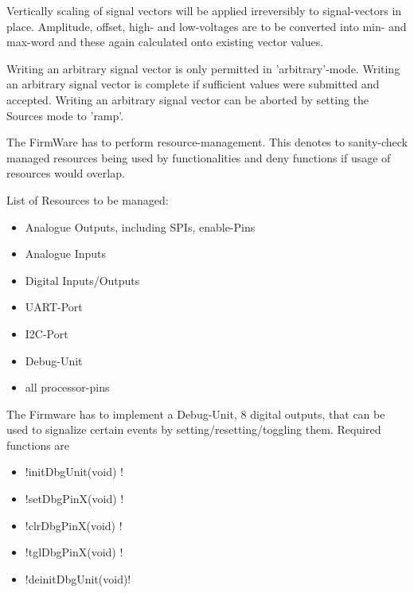 	{	Vertically scaling of signal vectors will be applied irreversibly to signal-vectors in place.
		Amplitude, offset, high- and low-voltages are to be converted into min- and max-word and these again calculated onto existing vector values.
	}

	{	Writing an arbitrary signal vector is only permitted in 'arbitrary'-mode. 
		Writing an arbitrary signal vector is complete if sufficient values were submitted and accepted.
		Writing an arbitrary signal vector can be aborted by setting the Sources mode to 'ramp'.
	}

	{ The FirmWare has to perform resource-management. This denotes to sanity-check managed resources being used by functionalities and deny functions if usage of resources would overlap.}

	{ List of Resources to be managed:
		\begin{itemize} \setlength\itemsep{2px}
			\item Analogue Outputs, including SPIs, enable-Pins
			\item Analogue Inputs
			\item Digital Inputs/Outputs
			\item UART-Port
			\item I2C-Port
			\item Debug-Unit
			\item all processor-pins
		\end{itemize}
	}

	{ The Firmware has to implement a Debug-Unit, 8 digital outputs, that can be used to signalize certain events by setting/resetting/toggling them.
		Required functions are 
		\begin{itemize} \setlength\itemsep{1px}
		\item \lstC !initDbgUnit(void)  !
		\item \lstC !setDbgPinX(void)   !
		\item \lstC !clrDbgPinX(void)   !
		\item \lstC !tglDbgPinX(void)   !
		\item \lstC !deinitDbgUnit(void)!
		\end{itemize}
	}

